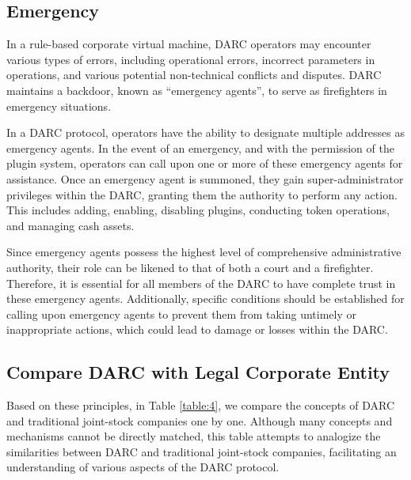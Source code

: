 \documentclass[main.tex]{subfiles}
\begin{document}
\subsection{Emergency}

In a rule-based corporate virtual machine, DARC operators may encounter various types of errors, including operational errors, incorrect parameters in operations, and various potential non-technical conflicts and disputes. DARC maintains a backdoor, known as ``emergency agents'', to serve as firefighters in emergency situations.

In a DARC protocol, operators have the ability to designate multiple addresses as emergency agents. In the event of an emergency, and with the permission of the plugin system, operators can call upon one or more of these emergency agents for assistance. Once an emergency agent is summoned, they gain super-administrator privileges within the DARC, granting them the authority to perform any action. This includes adding, enabling, disabling plugins, conducting token operations, and managing cash assets.

Since emergency agents possess the highest level of comprehensive administrative authority, their role can be likened to that of both a court and a firefighter. Therefore, it is essential for all members of the DARC to have complete trust in these emergency agents. Additionally, specific conditions should be established for calling upon emergency agents to prevent them from taking untimely or inappropriate actions, which could lead to damage or losses within the DARC.

\subsection{Compare DARC with Legal Corporate Entity}

Based on these principles, in Table \ref{table:4}, we compare the concepts of DARC and traditional joint-stock companies one by one. Although many concepts and mechanisms cannot be directly matched, this table attempts to analogize the similarities between DARC and traditional joint-stock companies, facilitating an understanding of various aspects of the DARC protocol.
\end{document}
